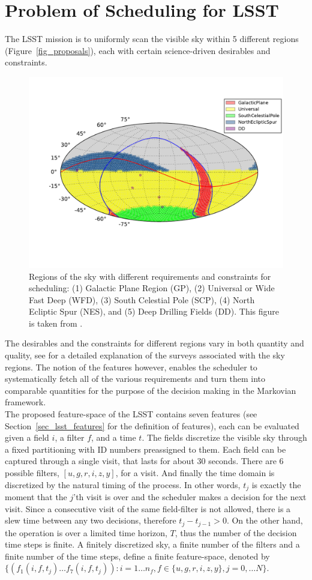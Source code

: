 \documentclass[11pt]{article}
\theoremstyle{definition}
\begin{document}
\section{Problem of Scheduling for LSST}\label{sec_lsst_problem}
The LSST mission is to uniformly scan the visible sky within 5 different regions (Figure~\ref{fig_proposals}), each with certain science-driven desirables and constraints.\\
\begin{figure}[h!]
\begin{center}
\includegraphics[width=.6\linewidth]{Figures/minion_1016_proposal_footprint.pdf}
\caption{Regions of the sky with different requirements and constraints for scheduling: (1) Galactic Plane Region (GP), (2) Universal or Wide Fast Deep (WFD), (3) South Celestial Pole (SCP), (4) North Ecliptic Spur (NES), and (5) Deep Drilling Fields (DD). This figure is taken from \cite{jones2017large}.}
\end{center}
\end{figure}\label{fig_proposals}
The desirables and the constraints for different regions vary in both quantity and quality, see \cite{ivezic2008lsst} for a detailed explanation of the surveys associated with the sky regions. The notion of the features however, enables the scheduler to systematically fetch all of the various requirements and turn them into comparable quantities for the purpose of the decision making in the Markovian framework.\\
The proposed feature-space of the LSST contains seven features (see Section~\ref{sec_lsst_features} for the definition of features), each can be evaluated given a field $i$, a filter $f$, and a time $t$. The fields discretize the visible sky through a fixed partitioning with ID numbers preassigned to them. Each field can be captured through a single visit, that lasts for about 30 seconds. There are 6 possible filters, $[u,g,r,i,z,y]$, for a visit. And finally the time domain is discretized by the natural timing of the process. In other words, $t_j$ is exactly the moment that the $j$'th visit is over and the scheduler makes a decision for the next visit. Since a consecutive visit of the same field-filter is not allowed, there is a slew time between any two decisions, therefore $t_{j} - t_{j-1} > 0$. On the other hand, the operation is over a limited time horizon, $T$, thus the number of the decision time steps is finite. A finitely discretized sky, a finite number of the filters and a finite number of the time steps, define a finite feature-space, denoted by $\{(f_1(i,f,t_j)\dots f_7(i,f,t_j)): i = 1\dots n_f, f\in \{u,g,r,i,z,y\}, j = 0,\dots N\}$.
\end{document}
